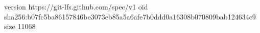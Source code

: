version https://git-lfs.github.com/spec/v1
oid sha256:b07fc5ba86157846be3073eb85a5a6afe7b0ddd0a16308b070809bab124634c9
size 11068
